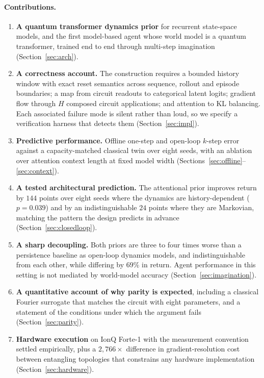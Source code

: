 \documentclass[11pt,onecolumn]{article}
\begin{document}
\paragraph{Contributions.}
\begin{enumerate}\itemsep3pt
\item \textbf{A quantum transformer dynamics prior} for recurrent
      state-space models, and the first model-based agent whose world
      model is a quantum transformer, trained end to end through
      multi-step imagination (Section~\ref{sec:arch}).
\item \textbf{A correctness account.} The construction requires a
      bounded history window with exact reset semantics across sequence,
      rollout and episode boundaries; a map from circuit readouts to
      categorical latent logits; gradient flow through $H$ composed
      circuit applications; and attention to KL balancing. Each
      associated failure mode is silent rather than loud, so we specify
      a verification harness that detects them
      (Section~\ref{sec:impl}).
\item \textbf{Predictive performance.} Offline one-step and open-loop
      $k$-step error against a capacity-matched classical twin over
      eight seeds, with an ablation over attention context length at
      fixed model width (Sections~\ref{sec:offline}--\ref{sec:context}).
\item \textbf{A tested architectural prediction.} The attentional
      prior improves return by $144$ points over eight seeds where the
      dynamics are history-dependent ($p = 0.039$) and by an
      indistinguishable $24$ points where they are Markovian, matching
      the pattern the design predicts in advance
      (Section~\ref{sec:closedloop}).
\item \textbf{A sharp decoupling.} Both priors are three to four
      times worse than a persistence baseline as open-loop dynamics
      models, and indistinguishable from each other, while differing by
      $69\%$ in return. Agent performance in this setting is not
      mediated by world-model accuracy
      (Section~\ref{sec:imagination}).
\item \textbf{A quantitative account of why parity is expected},
      including a classical Fourier surrogate that matches the circuit
      with eight parameters, and a statement of the conditions under
      which the argument fails (Section~\ref{sec:parity}).
\item \textbf{Hardware execution} on IonQ Forte-1 with the measurement
      convention settled empirically, plus a $2{,}766\times$ difference
      in gradient-resolution cost between entangling topologies that
      constrains any hardware implementation
      (Section~\ref{sec:hardware}).
\end{enumerate}
\end{document}
